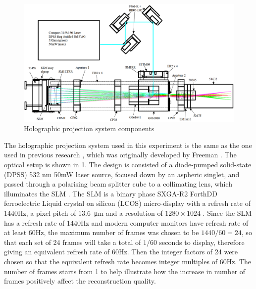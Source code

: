 	\begin{figure}[h!t]
		\centering
		\includegraphics[width=1.0\textwidth]{holographic_projector.png}
		\caption{Holographic projection system components \cite{Freeman2009}}
		\label{fig:holographic_projector}
	\end{figure}
	
	The holographic projection system used in this experiment is the same as the one used in previous research \cite{Sha2023DPD}, which was originally developed by Freeman \cite{Freeman2009}. The optical setup is shown in \cref{fig:holographic_projector}. The design is consisted of a diode-pumped solid-state (DPSS) 532 nm 50mW laser source, focused down by an aspheric singlet, and passed through a polarising beam splitter cube to a collimating lens, which illuminates the SLM \cite{Freeman2009}. The SLM is a binary phase SXGA-R2 ForthDD ferroelectric Liquid crystal on silicon (LCOS) micro-display with a refresh rate of 1440Hz, a pixel pitch of \SI{13.6}{\micro\metre} and a resolution of $1280\times1024$ \cite{Freeman2009}. Since the SLM has a refresh rate of 1440Hz and modern computer monitors have refresh rate of at least 60Hz, the maximum number of frames was chosen to be $1440/60=24$, so that each set of 24 frames will take a total of $1/60$ seconds to display, therefore giving an equivalent refresh rate of 60Hz. Then the integer factors of 24 were chosen so that the equivalent refresh rate becomes integer multiples of 60Hz. The number of frames starts from 1 to help illustrate how the increase in number of frames positively affect the reconstruction quality.
	
